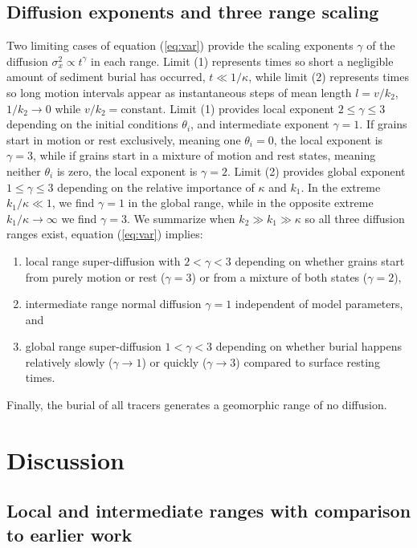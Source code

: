 \subsection{Diffusion exponents and three range scaling}

Two limiting cases of equation (\ref{eq:var}) provide the scaling exponents $\gamma$ of the diffusion $\sigma_x^2 \propto t^\gamma$ in each range. Limit (1) represents times so short a negligible amount of sediment burial has occurred, $t\ll 1/\kappa$, while limit (2) represents times so long motion intervals appear as instantaneous steps of mean length $l=v/k_2$, $1/k_2 \rightarrow 0$ while $v/k_2 = \text{constant}$.
Limit (1) provides local exponent $2 \leq \gamma \leq 3$ depending on the initial conditions $\theta_i$, and intermediate exponent $\gamma=1$.
If grains start in motion or rest exclusively, meaning one $\theta_i = 0$, the local exponent is $\gamma=3$, while if grains start in a mixture of motion and rest states, meaning neither $\theta_i$ is zero, the local exponent is $\gamma=2$.
Limit (2) provides global exponent $1 \leq \gamma \leq 3$ depending on the relative importance of $\kappa$ and $k_1$.
In the extreme $k_1/\kappa \ll 1$, we find $\gamma=1$ in the global range, while in the opposite extreme $k_1/\kappa \rightarrow \infty$ we find $\gamma=3$.
We summarize when $k_2\gg k_1 \gg \kappa$ so all three diffusion ranges exist, equation (\ref{eq:var}) implies:
\begin{enumerate}
	\item local range super-diffusion with $2<\gamma<3$ depending on whether grains start from purely motion or rest ($\gamma=3$) or from a mixture of both states ($\gamma=2$),
	\item intermediate range normal diffusion $\gamma=1$ independent of model parameters, and
	\item global range super-diffusion $1<\gamma<3$ depending on whether burial happens relatively slowly ($\gamma \rightarrow 1$) or quickly ($\gamma \rightarrow 3$) compared to surface resting times.
\end{enumerate}
Finally, the burial of all tracers generates a geomorphic range of no diffusion.

\section{Discussion}
\label{sec:discussion}

\subsection{Local and intermediate ranges with comparison to earlier work}

